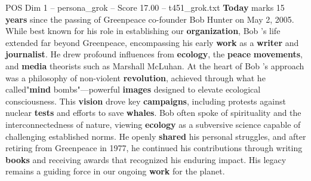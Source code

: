 \begin{textsample}{POS Dim 1 – persona\_grok – Score 17.00 – t451\_grok.txt}  \label{ex:f1_pos_036}
\textbf{Today} marks 15 \textbf{years} since the passing of Greenpeace co-founder Bob Hunter on May 2, 2005.
While best known for his role in establishing our \textbf{organization}, Bob 's life extended far beyond Greenpeace, encompassing his early \textbf{work} as a \textbf{writer} and \textbf{journalist}.
He drew profound influences from \textbf{ecology}, the \textbf{peace} \textbf{movements}, and \textbf{media} theorists such as Marshall McLuhan.
At the heart of Bob 's approach was a philosophy of non-violent \textbf{revolution}, achieved through what he called"\textbf{mind} bombs"—powerful \textbf{images} designed to elevate ecological consciousness.
This \textbf{vision} drove key \textbf{campaigns}, including protests against nuclear \textbf{tests} and efforts to save \textbf{whales}.
Bob often spoke of spirituality and the interconnectedness of nature, viewing \textbf{ecology} as a subversive science capable of challenging established norms.
He openly \textbf{shared} his personal struggles, and after retiring from Greenpeace in 1977, he continued his contributions through writing \textbf{books} and receiving awards that recognized his enduring impact.
His legacy remains a guiding force in our ongoing \textbf{work} for the planet.

\end{textsample}
